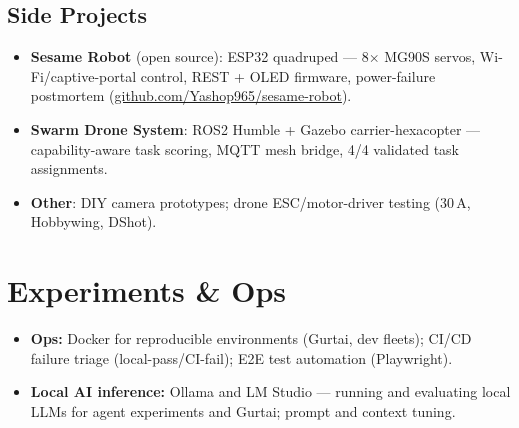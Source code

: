 \documentclass[10pt]{article}
\newif\ifmllead \mlleadfalse
\newcommand{\itemhead}[1]{\textbf{#1}}
\begin{document}
\subsection{Side Projects}
\begin{itemize}
  \item \itemhead{Sesame Robot} (open source): ESP32 quadruped --- 8$\times$ MG90S servos, Wi-Fi/captive-portal control, REST + OLED firmware, power-failure postmortem (\href{https://github.com/Yashop965/sesame-robot}{github.com/Yashop965/sesame-robot}).
  \item \itemhead{Swarm Drone System}: ROS2 Humble + Gazebo carrier-hexacopter --- capability-aware task scoring, MQTT mesh bridge, 4/4 validated task assignments.
  \item \itemhead{Other}: DIY camera prototypes; drone ESC/motor-driver testing (30\,A, Hobbywing, DShot).
\end{itemize}
\fi
\fi

\section{Experiments \& Ops}
\begin{itemize}
  \item \itemhead{Ops:} Docker for reproducible environments (Gurtai, dev fleets); CI/CD failure triage (local-pass/CI-fail); E2E test automation (Playwright).
  \item \itemhead{Local AI inference:} Ollama and LM Studio --- running and evaluating local LLMs for agent experiments and Gurtai; prompt and context tuning.
\ifmllead
  \item \itemhead{Simulation:} ROS2 Humble + Gazebo headless testing in WSL2 --- URDF modeling, gait-pattern validation (4/4 task assignments on the swarm system).
  \item \itemhead{Lab work:} IoT \& Robotics Foundation Lab (CSE25309) --- ESP32/I2C/PWM servo control, circuit simulation (Tinkercad), 8-DOF quadruped project.
\fi
\end{itemize}

\end{document}
